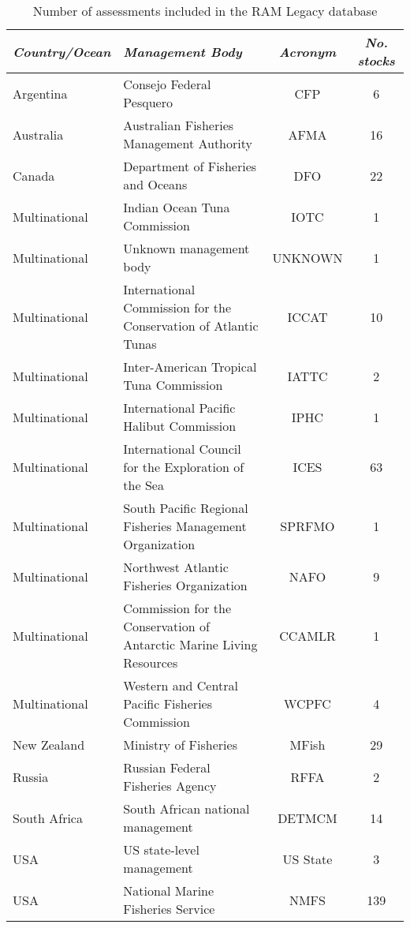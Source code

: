 \begin{table}[ht]
\begin{center}
\caption{Number of assessments included in the RAM Legacy database}
\label{tab:mgmt}
\begin{tabular}{p{3cm}p{5cm}cc}
\textit{Country/Ocean} & \textit{Management Body} & \textit{Acronym} & \textit{No. stocks} \\ \midrule
Argentina & Consejo Federal Pesquero & CFP &   6 \\ 
  Australia & Australian Fisheries Management Authority & AFMA &  16 \\ 
  Canada & Department of Fisheries and Oceans & DFO &  22 \\ 
  Multinational & Indian Ocean Tuna Commission & IOTC &   1 \\ 
  Multinational & Unknown management body & UNKNOWN &   1 \\ 
  Multinational & International Commission for the Conservation of Atlantic Tunas & ICCAT &  10 \\ 
  Multinational & Inter-American Tropical Tuna Commission & IATTC &   2 \\ 
  Multinational & International Pacific Halibut Commission & IPHC &   1 \\ 
  Multinational & International Council for the Exploration of the Sea & ICES &  63 \\ 
  Multinational & South Pacific Regional Fisheries Management Organization & SPRFMO &   1 \\ 
  Multinational & Northwest Atlantic Fisheries Organization & NAFO &   9 \\ 
  Multinational & Commission for the Conservation of Antarctic Marine Living Resources & CCAMLR &   1 \\ 
  Multinational & Western and Central Pacific Fisheries Commission & WCPFC &   4 \\ 
  New Zealand & Ministry of Fisheries & MFish &  29 \\ 
  Russia & Russian Federal Fisheries Agency & RFFA &   2 \\ 
  South Africa & South African national management & DETMCM &  14 \\ 
  USA & US state-level management & US State &   3 \\ 
  USA & National Marine Fisheries Service & NMFS & 139 \\ 
   \hline
\end{tabular}
\end{center}
\end{table}
